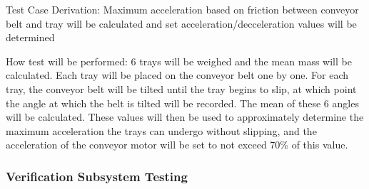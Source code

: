 \documentclass[12pt, titlepage]{article}
\begin{document}
\begin{enumerate}
Test Case Derivation: Maximum acceleration based on friction between conveyor belt and tray will be calculated 
and set acceleration/decceleration values will be determined

How test will be performed: 6 trays will be weighed and the mean mass will be calculated. Each tray will be placed on 
the conveyor belt one by one. For each tray, the conveyor belt will be tilted until the tray begins to slip, at which
point the angle at which the belt is tilted will be recorded. The mean of these 6 angles will be calculated. These values
will then be used to approximately determine the maximum acceleration the trays can undergo without slipping, and the
acceleration of the conveyor motor will be set to not exceed 70\% of this value.
\\
\end{enumerate}

\subsubsection{Verification Subsystem Testing}
\end{document}
